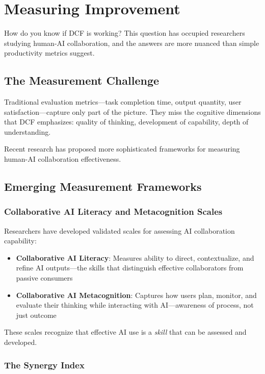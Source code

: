 \chapter{Measuring Improvement}

How do you know if DCF is working? This question has occupied researchers studying human-AI collaboration, and the answers are more nuanced than simple productivity metrics suggest.

\section{The Measurement Challenge}

Traditional evaluation metrics---task completion time, output quantity, user satisfaction---capture only part of the picture. They miss the cognitive dimensions that DCF emphasizes: quality of thinking, development of capability, depth of understanding.

Recent research has proposed more sophisticated frameworks for measuring human-AI collaboration effectiveness.

\section{Emerging Measurement Frameworks}

\subsection{Collaborative AI Literacy and Metacognition Scales}

Researchers have developed validated scales for assessing AI collaboration capability:

\begin{itemize}
    \item \textbf{Collaborative AI Literacy}: Measures ability to direct, contextualize, and refine AI outputs---the skills that distinguish effective collaborators from passive consumers
    \item \textbf{Collaborative AI Metacognition}: Captures how users plan, monitor, and evaluate their thinking while interacting with AI---awareness of process, not just outcome
\end{itemize}

These scales recognize that effective AI use is a \emph{skill} that can be assessed and developed.

\subsection{The Synergy Index}


